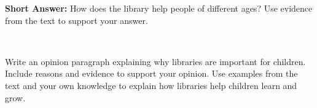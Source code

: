 \documentclass[12pt]{article}
\begin{document}
\begin{tcolorbox}[colframe=black!50, colback=white, title=Question 9]
\textbf{Short Answer:} How does the library help people of different ages? Use evidence from the text to support your answer.  

\vspace{2em}
\underline{\hspace{15.8cm}}  
    \\[0.8cm] \underline{\hspace{15.8cm}}  
\end{tcolorbox}

\begin{tcolorbox}[colframe=black!50, colback=white, title=Question 10: Writing Performance Task]
Write an opinion paragraph explaining why libraries are important for children. Include reasons and evidence to support your opinion. Use examples from the text and your own knowledge to explain how libraries help children learn and grow.

\vspace{2em}
\underline{\hspace{15.8cm}}  
    \\[0.8cm] \underline{\hspace{15.8cm}}  
    \\[0.8cm] \underline{\hspace{15.8cm}}  
    \\[0.8cm] \underline{\hspace{15.8cm}}  
    \\[0.8cm] \underline{\hspace{15.8cm}}  
    \\[0.8cm] \underline{\hspace{15.8cm}}
\end{tcolorbox}
\end{document}
